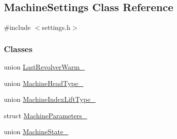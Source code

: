 \hypertarget{classMachineSettings}{}\subsection{Machine\+Settings Class Reference}
\label{classMachineSettings}


{\ttfamily \#include $<$settings.\+h$>$}

\subsubsection*{Classes}
\begin{DoxyCompactItemize}
\item 
union \mbox{\hyperlink{unionMachineSettings_1_1LastRevolverWarm__}{Last\+Revolver\+Warm\+\_\+}}
\item 
union \mbox{\hyperlink{unionMachineSettings_1_1MachineHeadType__}{Machine\+Head\+Type\+\_\+}}
\item 
union \mbox{\hyperlink{unionMachineSettings_1_1MachineIndexLiftType__}{Machine\+Index\+Lift\+Type\+\_\+}}
\item 
struct \mbox{\hyperlink{structMachineSettings_1_1MachineParameters__}{Machine\+Parameters\+\_\+}}
\item 
union \mbox{\hyperlink{unionMachineSettings_1_1MachineState__}{Machine\+State\+\_\+}}
\end{DoxyCompactItemize}

